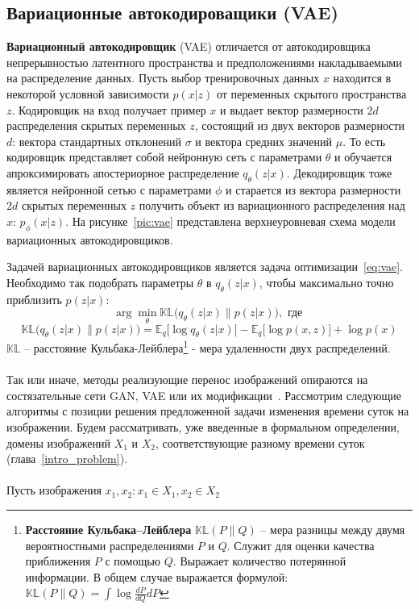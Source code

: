 \documentclass[11pt,a4paper]{extarticle}
\begin{document}
	\subsection{Вариационные автокодироващики (VAE)} \label{sec:vae}		

		\textbf{Вариационный автокодировщик} (VAE) отличается от автокодировщика непрерывностью латентного пространства
		и предположениями накладываемыми на распределение данных.
		Пусть выбор тренировочных данных $x$ находится в некоторой условной зависимости $p(x|z)$ от переменных скрытого пространства $z$.
		Кодировщик на вход получает пример $x$ и выдает вектор размерности $2d$ распределения скрытых переменных $z$, состоящий из двух векторов размерности $d$:
		вектора стандартных отклонений $\sigma$ и вектора средних значений $\mu$. 
		То есть кодировщик представляет собой нейронную сеть с параметрами $\theta$ и обучается апроксимировать апостериорное распределение $q_{\theta}(z|x)$.
		Декодировщик тоже является нейронной сетью с параметрами $\phi$ и старается из вектора размерности $2d$ скрытых переменных $z$ получить объект из вариационного распределения над $x$: $p_{\phi}(x|z)$.
		На рисунке~\ref{pic:vae} представлена верхнеуровневая схема модели вариационных автокодировщиков.

		Задачей вариационных автокодировщиков является задача оптимизации~\eqref{eq:vae}.
		Необходимо так подобрать параметры $\theta$ в $q_{\theta}(z|x)$, чтобы максимально точно приблизить $p(z|x)$:
		\begin{equation} \label{eq:vae}
			\arg\min_{\theta} \mathbb{KL}\big(q_{\theta}(z|x)\|p(z|x)\big), \text { где }
		\end{equation}
		\begin{equation*}
			\mathbb{KL}\big(q_{\theta}(z|x)\|p(z|x)\big) = \mathbb{E}_q\big[\log q_{\theta}(z|x)\big] - \mathbb{E}_q\big[\log p(x,z)\big] + \log p(x)
		\end{equation*}
		$\mathbb{KL}$ -- расстояние Кульбака-Лейблера\footnote{
			\textbf{Расстояние Кульбака--Лейблера} \(\mathbb{KL}(P\|Q)\) -- мера разницы между двумя вероятностными распределениями \(P\) и \(Q\). Служит для оценки качества приближения \(P\) с помощью \(Q\). Выражает количество потерянной информации.
			В общем случае выражается формулой: \(\mathbb{KL}(P\|Q) = \int\log\frac{dP}{dQ}dP \)
		} - мера удаленности двух распределений.
		\\\\
		Так или иначе, методы реализующие перенос изображений опираются на состязательные сети GAN, VAE или их модификации~\cite{coGAN, BicycleGAN,CycleGAN,DRIT,UNIT,MUNIT,pix2pix}.
		Рассмотрим следующие алгоритмы с позиции решения предложенной задачи изменения времени суток на изображении.
		Будем рассматривать, уже введенные в формальном определении, домены изображений \(X_{1}\) и \(X_{2}\), соответствующие разному времени суток (глава~\ref{intro_problem}).
		\\\\Пусть изображения \(x_{1},x_{2}: x_{1} \in X_{1}, x_{2} \in X_{2}\)
\end{document}
